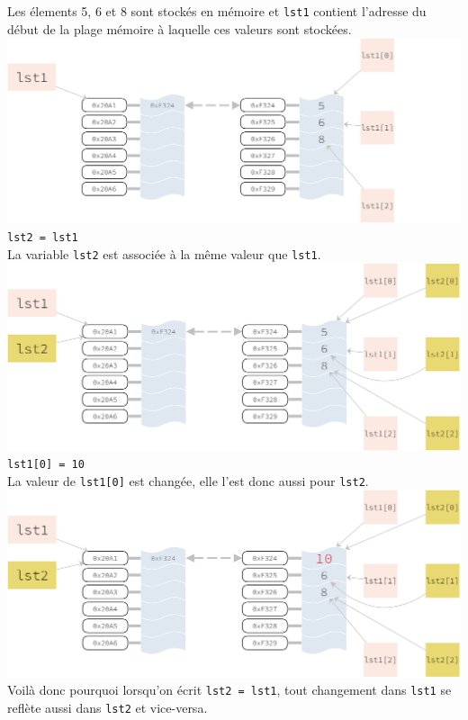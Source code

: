 Les élements 5, 6 et 8 sont stockés en mémoire et \texttt{lst1} contient l'adresse du début de la plage mémoire à laquelle ces valeurs sont stockées. \\
\includegraphics[width=\linewidth]{ch-listes/img/mut1.png}\\


 \texttt{lst2 = lst1}\\

La variable \texttt{lst2} est associée à la même valeur que \texttt{lst1}.\\
\includegraphics[width=\linewidth]{ch-listes/img/mut2.png}\\


\texttt{lst1[0] = 10}\\

La valeur de \texttt{lst1[0]} est changée, elle l'est donc aussi pour \texttt{lst2}.\\
\includegraphics[width=\linewidth]{ch-listes/img/mut3.png} \\
Voilà donc pourquoi lorsqu'on écrit \texttt{lst2 = lst1}, tout changement dans \texttt{lst1} se reflète aussi dans \texttt{lst2} et vice-versa.\\

